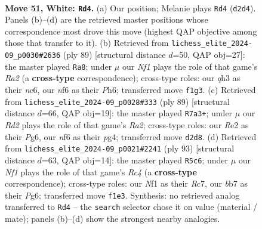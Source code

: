 \documentclass[11pt]{article}
\begin{document}
\clearpage

\begin{figure}[p]\centering
\begin{subfigure}{0.46\textwidth}\centering
\resizebox{\linewidth}{!}{%
\newchessgame
\chessboard[
  setfen={8/1b3pk1/5np1/8/7P/7q/3RR2P/5NK1 w - - 9 51},
  showmover=false,
  pgfstyle=straightmove, color=movearrow, markmove={d2-d4}
]}
\caption{}
\end{subfigure}\hfill
\begin{subfigure}{0.46\textwidth}\centering
\resizebox{\linewidth}{!}{%
\newchessgame
\chessboard[
  setfen={5Q2/r5pk/2N4p/r7/8/6PK/7P/8 b - - 9 45},
  showmover=false,
  pgfstyle=straightmove, color=movearrow, markmove={a7-a8}
]}
\caption{}
\end{subfigure}
\\[4pt]
\begin{subfigure}{0.46\textwidth}\centering
\resizebox{\linewidth}{!}{%
\newchessgame
\chessboard[
  setfen={8/r5k1/5pp1/3Q4/6PP/6K1/r7/8 b - - 6 45},
  showmover=false,
  pgfstyle=straightmove, color=movearrow, markmove={a7-a3}
]}
\caption{}
\end{subfigure}\hfill
\begin{subfigure}{0.46\textwidth}\centering
\resizebox{\linewidth}{!}{%
\newchessgame
\chessboard[
  setfen={8/2r3k1/3Q1pp1/2r4p/8/6P1/5PKP/8 b - - 1 47},
  showmover=false,
  pgfstyle=straightmove, color=movearrow, markmove={c5-c6}
]}
\caption{}
\end{subfigure}
\caption{\textbf{Move 51, White: \texttt{Rd4}.} (a) Our position; Melanie plays \texttt{Rd4} (\texttt{d2d4}). Panels (b)--(d) are the retrieved master positions whose correspondence most drove this move (highest QAP objective among those that transfer to it). (b) Retrieved from \texttt{lichess\_elite\_2024-09\_p0030\#2636} (ply 89) [structural distance $d$=50, QAP obj=27]: the master played \texttt{Ra8}; under $\mu$ our \emph{Nf1} plays the role of that game's \emph{Ra2} (a \textbf{cross-type} correspondence); cross-type roles: our \emph{q}h3 as their \emph{n}c6, our \emph{n}f6 as their \emph{P}h6; transferred move \texttt{f1g3}. (c) Retrieved from \texttt{lichess\_elite\_2024-09\_p0028\#333} (ply 89) [structural distance $d$=66, QAP obj=19]: the master played \texttt{R7a3+}; under $\mu$ our \emph{Rd2} plays the role of that game's \emph{Ra2}; cross-type roles: our \emph{R}e2 as their \emph{P}g6, our \emph{n}f6 as their \emph{p}g4; transferred move \texttt{d2d8}. (d) Retrieved from \texttt{lichess\_elite\_2024-09\_p0021\#2241} (ply 93) [structural distance $d$=63, QAP obj=14]: the master played \texttt{R5c6}; under $\mu$ our \emph{Nf1} plays the role of that game's \emph{Rc4} (a \textbf{cross-type} correspondence); cross-type roles: our \emph{N}f1 as their \emph{R}c7, our \emph{b}b7 as their \emph{P}g6; transferred move \texttt{f1e3}. Synthesis: no retrieved analog transferred to \texttt{Rd4} -- the \texttt{search} selector chose it on value (material / mate); panels (b)--(d) show the strongest nearby analogies.}
\label{fig:thought-m100}
\end{figure}
\end{document}
